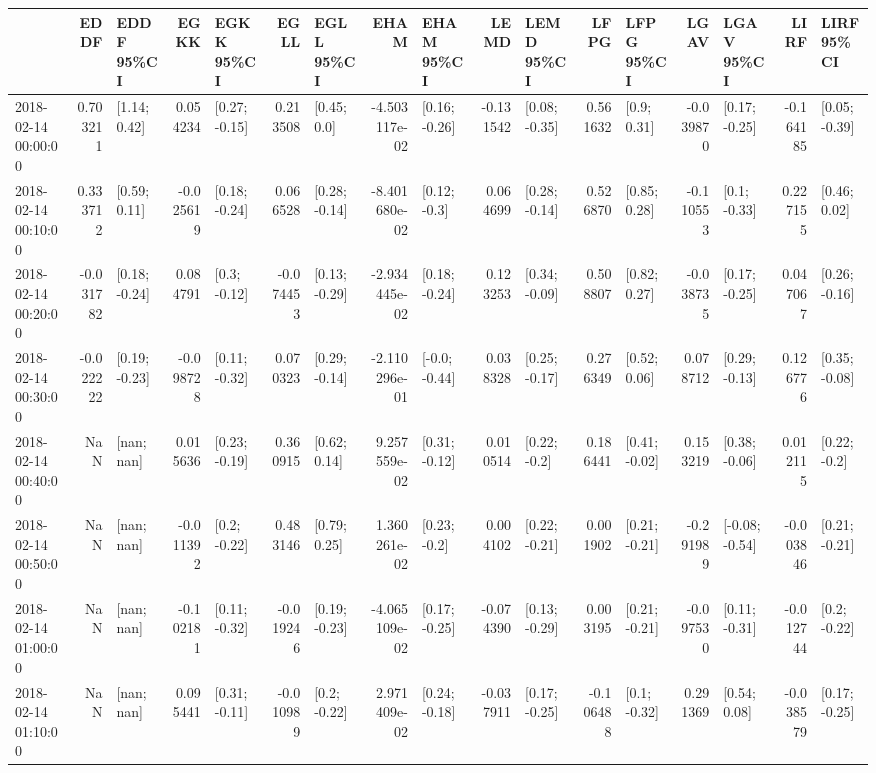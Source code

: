 \begin{tabular}{lrlrlrlrlrlrlrlrl}
\toprule
{} &      EDDF &      EDDF 95\%CI &      EGKK &      EGKK 95\%CI &      EGLL &      EGLL 95\%CI &          EHAM &      EHAM 95\%CI &      LEMD &      LEMD 95\%CI &      LFPG &      LFPG 95\%CI &      LGAV &      LGAV 95\%CI &      LIRF &      LIRF 95\%CI \\
\midrule
2018-02-14 00:00:00 &  0.703211 &    [1.14; 0.42] &  0.054234 &   [0.27; -0.15] &  0.213508 &     [0.45; 0.0] & -4.503117e-02 &   [0.16; -0.26] & -0.131542 &   [0.08; -0.35] &  0.561632 &     [0.9; 0.31] & -0.039870 &   [0.17; -0.25] & -0.164185 &   [0.05; -0.39] \\
2018-02-14 00:10:00 &  0.333712 &    [0.59; 0.11] & -0.025619 &   [0.18; -0.24] &  0.066528 &   [0.28; -0.14] & -8.401680e-02 &    [0.12; -0.3] &  0.064699 &   [0.28; -0.14] &  0.526870 &    [0.85; 0.28] & -0.110553 &    [0.1; -0.33] &  0.227155 &    [0.46; 0.02] \\
2018-02-14 00:20:00 & -0.031782 &   [0.18; -0.24] &  0.084791 &    [0.3; -0.12] & -0.074453 &   [0.13; -0.29] & -2.934445e-02 &   [0.18; -0.24] &  0.123253 &   [0.34; -0.09] &  0.508807 &    [0.82; 0.27] & -0.038735 &   [0.17; -0.25] &  0.047067 &   [0.26; -0.16] \\
2018-02-14 00:30:00 & -0.022222 &   [0.19; -0.23] & -0.098728 &   [0.11; -0.32] &  0.070323 &   [0.29; -0.14] & -2.110296e-01 &   [-0.0; -0.44] &  0.038328 &   [0.25; -0.17] &  0.276349 &    [0.52; 0.06] &  0.078712 &   [0.29; -0.13] &  0.126776 &   [0.35; -0.08] \\
2018-02-14 00:40:00 &       NaN &      [nan; nan] &  0.015636 &   [0.23; -0.19] &  0.360915 &    [0.62; 0.14] &  9.257559e-02 &   [0.31; -0.12] &  0.010514 &    [0.22; -0.2] &  0.186441 &   [0.41; -0.02] &  0.153219 &   [0.38; -0.06] &  0.012115 &    [0.22; -0.2] \\
2018-02-14 00:50:00 &       NaN &      [nan; nan] & -0.011392 &    [0.2; -0.22] &  0.483146 &    [0.79; 0.25] &  1.360261e-02 &    [0.23; -0.2] &  0.004102 &   [0.22; -0.21] &  0.001902 &   [0.21; -0.21] & -0.291989 &  [-0.08; -0.54] & -0.003846 &   [0.21; -0.21] \\
2018-02-14 01:00:00 &       NaN &      [nan; nan] & -0.102181 &   [0.11; -0.32] & -0.019246 &   [0.19; -0.23] & -4.065109e-02 &   [0.17; -0.25] & -0.074390 &   [0.13; -0.29] &  0.003195 &   [0.21; -0.21] & -0.097530 &   [0.11; -0.31] & -0.012744 &    [0.2; -0.22] \\
2018-02-14 01:10:00 &       NaN &      [nan; nan] &  0.095441 &   [0.31; -0.11] & -0.010989 &    [0.2; -0.22] &  2.971409e-02 &   [0.24; -0.18] & -0.037911 &   [0.17; -0.25] & -0.106488 &    [0.1; -0.32] &  0.291369 &    [0.54; 0.08] & -0.038579 &   [0.17; -0.25] \\

\end{tabular}
